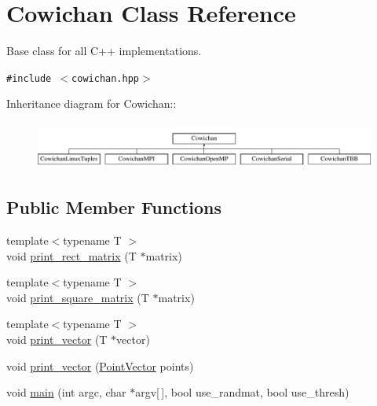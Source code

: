 \hypertarget{class_cowichan}{
\section{Cowichan Class Reference}
\label{class_cowichan}
}
Base class for all C++ implementations.  


{\tt \#include $<$cowichan.hpp$>$}

Inheritance diagram for Cowichan::\begin{figure}[H]
\begin{center}
\leavevmode
\includegraphics[height=1.56643cm]{class_cowichan}
\end{center}
\end{figure}
\subsection*{Public Member Functions}
\begin{CompactItemize}
\item 
{\footnotesize template$<$typename T $>$ }\\void \hyperlink{class_cowichan_14e706ef5a5f7661a623c595d7ed76f1}{print\_\-rect\_\-matrix} (T $\ast$matrix)
\item 
{\footnotesize template$<$typename T $>$ }\\void \hyperlink{class_cowichan_e8fdfb7dd3e8be0a7e9dbc531b1298d2}{print\_\-square\_\-matrix} (T $\ast$matrix)
\item 
{\footnotesize template$<$typename T $>$ }\\void \hyperlink{class_cowichan_90f1155f5c35308796b142b15d681a4b}{print\_\-vector} (T $\ast$vector)
\item 
void \hyperlink{class_cowichan_3b974ae1693ac661fb079b28981ca885}{print\_\-vector} (\hyperlink{class_point}{PointVector} points)
\item 
void \hyperlink{class_cowichan_905f3eb45f21cdaa1c32a421d001fa4c}{main} (int argc, char $\ast$argv\mbox{[}$\,$\mbox{]}, bool use\_\-randmat, bool use\_\-thresh)
\end{CompactItemize}

